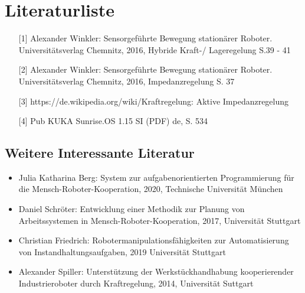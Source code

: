 \documentclass[12pt]{article}
\begin{document}
\section{Literaturliste}
\begin{itemize}
\item[] [1] Alexander Winkler: Sensorgeführte Bewegung stationärer Roboter. Universitätsverlag Chemnitz, 2016, Hybride Kraft-/ Lageregelung S.39 - 41
\item[] [2] Alexander Winkler: Sensorgeführte Bewegung stationärer Roboter. Universitätsverlag Chemnitz, 2016, Impedanzregelung S. 37
\item[] [3] https://de.wikipedia.org/wiki/Kraftregelung: Aktive Impedanzregelung
\item[] [4] Pub KUKA Sunrise.OS 1.15 SI (PDF) de, S. 534
\end{itemize}

\subsection{Weitere Interessante Literatur}
\begin{itemize}
\item Julia Katharina Berg: System zur aufgabenorientierten Programmierung für
die Mensch-Roboter-Kooperation, 2020, Technische Universität München
\item Daniel Schröter: Entwicklung einer Methodik zur Planung von
Arbeitssystemen in Mensch-Roboter-Kooperation, 2017, Universität Stuttgart
\item Christian Friedrich: Robotermanipulationsfähigkeiten zur Automatisierung von
Instandhaltungsaufgaben, 2019 Universität Stuttgart
\item Alexander Spiller: Unterstützung der Werkstückhandhabung
kooperierender Industrieroboter durch
Kraftregelung, 2014, Universität Suttgart

\end{itemize}
\end{document}
